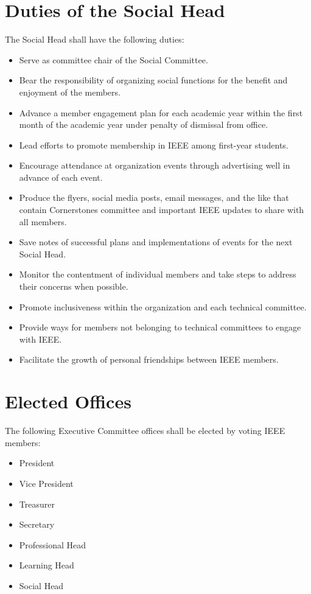 \documentclass[12pt]{constitution}
\begin{document}
\section{Duties of the Social Head}
\label{sec:officer_soc}
The Social Head shall have the following duties:
\begin{itemize}
    \item Serve as committee chair of the Social Committee.
    \item Bear the responsibility of organizing social functions for the benefit and enjoyment of the members.
    \item Advance a member engagement plan for each academic year within the first month of the academic year under penalty of dismissal from office.
    \item Lead efforts to promote membership in IEEE among first-year students.
    \item Encourage attendance at organization events through advertising well in advance of each event.
    \item Produce the flyers, social media posts, email messages, and the like that contain Cornerstones committee and important IEEE updates to share with all members.
    \item Save notes of successful plans and implementations of events for the next Social Head.
    \item Monitor the contentment of individual members and take steps to address their concerns when possible.
    \item Promote inclusiveness within the organization and each technical committee.
    \item Provide ways for members not belonging to technical committees to engage with IEEE.
    \item Facilitate the growth of personal friendships between IEEE members.
\end{itemize}


\label{art:elect}

\section{Elected Offices}
\label{sec:elect_list}
The following Executive Committee offices shall be elected by voting IEEE members:
\begin{itemize}
    \item President
    \item Vice President
    \item Treasurer
    \item Secretary
    \item Professional Head
    \item Learning Head
    \item Social Head
\end{itemize}
\end{document}
